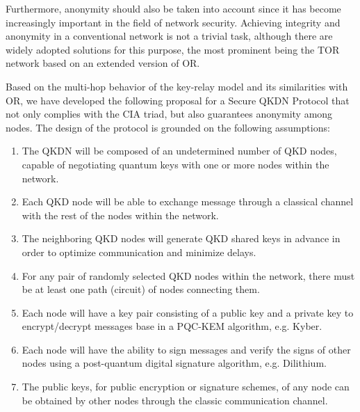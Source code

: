 \documentclass[conference]{IEEEtran}
\begin{document}
Furthermore, anonymity should also be taken into account since it has become increasingly important in the field of network security. Achieving integrity and anonymity in a conventional network is not a trivial task, although there are widely adopted solutions for this purpose, the most prominent being the TOR network based on an extended version of OR.


Based on the multi-hop behavior of the key-relay model and its similarities with OR, we have developed the following proposal for a Secure QKDN Protocol that not only complies with the CIA triad, but also guarantees anonymity among nodes. The design of the protocol is grounded on the following assumptions:

\begin{enumerate}
    \item The QKDN will be composed of an undetermined number of QKD nodes, capable of negotiating quantum keys with one or more nodes within the network.
    
    \item Each QKD node will be able to exchange message through a classical channel with the rest of the nodes within the network.
    
    \item The neighboring QKD nodes will generate QKD shared keys in advance in order to optimize communication and minimize delays.
    
    \item For any pair of randomly selected QKD nodes within the network, there must be at least one path (circuit) of nodes connecting them.
    
    \item Each node will have a key pair consisting of a public key and a private key to encrypt/decrypt messages base in a PQC-KEM algorithm, e.g. Kyber.  
    
    \item Each node will have the ability to sign messages and verify the signs of other nodes using a post-quantum digital signature algorithm, e.g. Dilithium.
    
    \item The public keys, for public encryption or signature schemes, of any node can be obtained by other nodes through the classic communication channel.
\end{enumerate}
\end{document}
